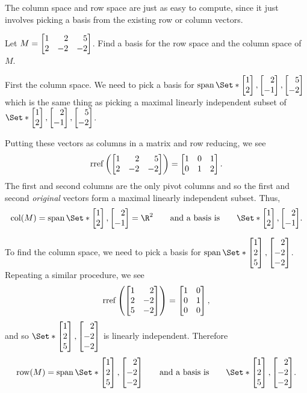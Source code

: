 The column space and row space are just as easy to compute, since it just involves picking
a basis from the existing row or column vectors.

\begin{example}
	Let $M=\mat{1&2&5\\2&-2&-2}$. Find a basis for the row space and the column space of $M$.

	First the column space. We need to pick a basis for $\Span\Set*{\mat{1\\2},\mat{2\\-1},\mat{5\\-2}}$
	which is the same thing as picking a maximal linearly independent subset of $\Set*{\mat{1\\2},\mat{2\\-1},\mat{5\\-2}}$.

	Putting these vectors as columns in a matrix and row reducing, we see
	\[
		\Rref\left(\mat{1&2&5\\2&-2&-2}\right) = \mat{1&0&1\\0&1&2}.
	\]
	The first and second columns are the only pivot columns and so the first and second \emph{original} vectors
	form a maximal linearly independent subset. Thus,
	\[
		\Col(M) = \Span\Set*{\mat{1\\2},\mat{2\\-1}} = \R^2\qquad\text{and a basis is}\qquad \Set*{\mat{1\\2},\mat{2\\-1}}.
	\]

	To find the column space, we need to pick a basis for $\Span\Set*{\mat{1\\2\\5},\mat{2\\-2\\-2}}$. Repeating
	a similar procedure, we see
	\[
		\Rref\left(\mat{1&2\\2&-2\\5&-2}\right) = \mat{1&0\\0&1\\0&0},
	\]
	and so $\Set*{\mat{1\\2\\5},\mat{2\\-2\\-2}}$ is linearly independent. Therefore
	\[
		\Row(M)=\Span\Set*{\mat{1\\2\\5},\mat{2\\-2\\-2}}\qquad\text{and a basis is}\qquad \Set*{\mat{1\\2\\5},\mat{2\\-2\\-2}}.
	\]
\end{example}

